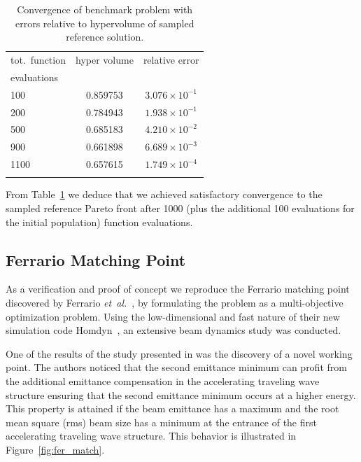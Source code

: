 \begin{table}%
\begin{center}
  \caption{Convergence of benchmark problem with errors relative to
    hypervolume of sampled reference solution.}
  \label{tbl:bench_rms_error}
  \begin{tabular}{lcc}
    \hline\noalign{\smallskip}
    tot.\ function  & hyper volume & relative error\\
    evaluations    & & \\
    \noalign{\smallskip}\hline\noalign{\smallskip}
    100  &  0.859753 & $3.076 \times 10^{-1}$ \\
    \noalign{\smallskip}\hline\noalign{\smallskip}
    200  &  0.784943 & $1.938 \times 10^{-1}$ \\
    500  &  0.685183 & $4.210 \times 10^{-2}$ \\
    900  &  0.661898 & $6.689 \times 10^{-3}$ \\
    1100 &  0.657615 & $1.749 \times 10^{-4}$ \\
    \noalign{\smallskip}\hline
  \end{tabular}
\end{center}
\end{table}

From Table~\ref{tbl:bench_rms_error} we deduce that we achieved satisfactory
  convergence to the sampled reference Pareto front after 1000 (plus the
  additional 100 evaluations for the initial population) function evaluations.


\subsection{Ferrario Matching Point}\label{ferrario}

As a verification and proof of concept we reproduce the Ferrario
  matching point discovered by Ferrario \textit{et~al.}~\cite{fcpr:00},
  by formulating the problem as a  multi-objective optimization problem.
Using the low-dimensional and fast nature of their new simulation code
  Homdyn~\cite{homdyn}, an extensive beam dynamics study was conducted.

One of the results of the study presented in \cite{fcpr:00} was the discovery
  of a novel working point.
The authors noticed that the second emittance minimum can profit from the
  additional emittance compensation in the accelerating traveling wave
  structure ensuring that the second emittance minimum occurs at a higher
  energy.
This property is attained if the beam emittance has a maximum and the root
  mean square (rms) beam size has a minimum at the entrance of the first
  accelerating traveling wave structure.
This behavior is illustrated in Figure~\ref{fig:fer_match}.


